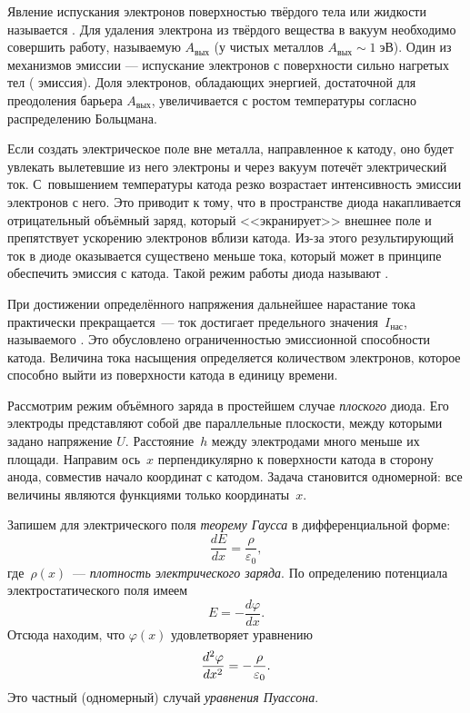 Явление испускания электронов поверхностью твёрдого тела или жидкости называется
. Для удаления электрона из твёрдого вещества в
вакуум необходимо совершить работу, называемую  $A_{вых}$
(у чистых металлов $A_{вых}\sim 1\;эВ$).
Один из механизмов эмиссии --- испускание электронов с поверхности сильно
нагретых тел ( эмиссия). 
Доля электронов, обладающих энергией, достаточной для преодоления барьера
$A_{вых}$, увеличивается с ростом температуры согласно 
распределению Больцмана.


Если создать электрическое поле вне металла, направленное к катоду, 
оно будет увлекать вылетевшие из него электроны 
и через вакуум потечёт электрический ток.
С~повышением температуры катода резко возрастает интенсивность эмиссии электронов с него. 
Это приводит к тому, что в пространстве диода
накапливается отрицательный
объёмный заряд, который  <<экранирует>> внешнее поле и препятствует ускорению электронов
вблизи катода. Из-за этого результирующий ток в диоде оказывается существено меньше тока, 
который может в принципе обеспечить эмиссия с катода. 
Такой режим работы диода называют .

При достижении определённого напряжения дальнейшее нарастание тока практически
прекращается~--- ток достигает предельного значения~$I_{нас}$, называемого
. Это обусловлено ограниченностью эмиссионной способности
катода. Величина тока насыщения определяется количеством электронов,
которое способно выйти из поверхности катода в единицу времени.

\label{sec:32}

Рассмотрим режим объёмного заряда в простейшем случае \emph{плоского}
диода. Его электроды представляют собой две параллельные плоскости,
между которыми задано напряжение $U$. Расстояние~$h$ между электродами много
меньше их площади. Направим ось~$x$ перпендикулярно к поверхности катода
в сторону анода, совместив начало координат с катодом. Задача
становится одномерной: все величины являются функциями только координаты~$x$.

Запишем для электрического поля \emph{теорему Гаусса} в дифференциальной
форме:
\[
\frac{dE}{dx} = \frac{\rho}{\varepsilon_0},
\]
где~$\rho(x)$~--- \emph{плотность электрического заряда}. По определению
потенциала электростатического поля имеем
\[
E = -\frac{d\varphi}{dx}.
\]
Отсюда находим, что $\varphi(x)$ удовлетворяет уравнению
\begin{equation}
    \eqmark{3.14}
    \frac{d^2\varphi}{dx^2}=-\frac{\rho}{\varepsilon_0}.
\end{equation}
Это частный (одномерный) случай \emph{уравнения Пуассона}.

